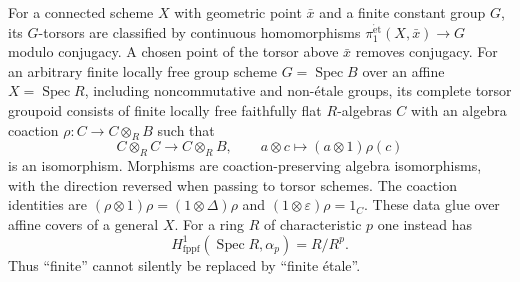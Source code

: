 \begin{proposition}
\label{geo-Kg}
For a connected scheme $X$ with geometric point $\bar x$ and a finite
constant group $G$, its $G$-torsors are classified by continuous
homomorphisms $\pi_1^{\mathrm{\acute et}}(X,\bar x)\to G$ modulo
conjugacy. A chosen point of the torsor above $\bar x$ removes conjugacy.
For an arbitrary finite locally free group scheme
$G=\operatorname{Spec}B$ over an affine $X=\operatorname{Spec}R$,
including noncommutative and non-\'{e}tale groups, its complete torsor
groupoid consists of finite locally free faithfully flat $R$-algebras $C$
with an algebra coaction $\rho:C\to C\otimes_R B$ such that
\[
 C\otimes_R C\longrightarrow C\otimes_R B,
 \qquad a\otimes c\longmapsto(a\otimes1)\rho(c)
\]
is an isomorphism. Morphisms are coaction-preserving algebra isomorphisms,
with the direction reversed when passing to torsor schemes.
The coaction identities are
$(\rho\otimes1)\rho=(1\otimes\Delta)\rho$ and
$(1\otimes\varepsilon)\rho=1_C$.
These data glue over affine covers of a general $X$.
For a ring $R$ of characteristic $p$ one instead has
\[
 H^1_{\mathrm{fppf}}(\operatorname{Spec}R,\alpha_p)=R/R^p.
\]
Thus ``finite'' cannot silently be replaced by ``finite \'etale''.
\end{proposition}
